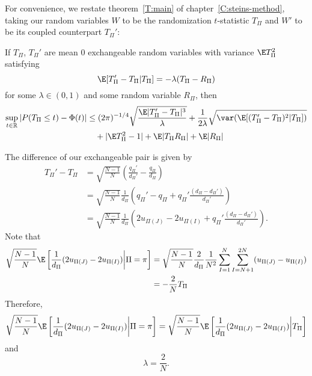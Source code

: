 For convenience, we restate theorem~\ref{T:main} of
chapter~\ref{C:steins-method}, taking our random variables $W$ to be
the randomization $t$-statistic $T_{\Pi}$ and $W'$ to be its coupled
counterpart $T_{\Pi}'$:
\begin{thma}
  If $T_{\Pi}$, $T_{\Pi}'$ are mean 0 exchangeable random variables with variance $\E T_{\Pi}^2$
  satisfying
  \begin{equation*}
    \E[T_{\Pi}'-T_{\Pi}|T_{\Pi}] = -\lambda(T_{\Pi}-R_{\Pi})
  \end{equation*}
  for some $\lambda \in (0,1)$ and some random variable $R_{\Pi}$, then
  \begin{equation*}
    \begin{split}
      \sup_{t \in \mathbb{R}} |P(T_{\Pi} \leq t) - \Phi(t)|
      &\leq (2\pi)^{-1/4} \sqrt{\frac{\E |T_{\Pi}'-T_{\Pi}|^3}{\lambda}}
      + \frac{1}{2\lambda} \sqrt{\var (\E [(T_{\Pi}'-T_{\Pi})^2|T_{\Pi}])} \\
      &\quad + |\E T_{\Pi}^2 - 1| + \E |T_{\Pi}R_{\Pi}| + \E |R_{\Pi}|
    \end{split}
  \end{equation*}
\end{thma}

The difference of our exchangeable pair is given by
\begin{align}
  T_{\Pi}' - T_{\Pi}
  &= \sqrt{\frac{N-1}{N}}\left (\frac{q_{\Pi}'}{d_{\Pi}'}-\frac{q_{\Pi}}{d_{\Pi}}\right )
  \nonumber \\
  &= \sqrt{\frac{N-1}{N}}\frac{1}{d_{\Pi}}\left (q_{\Pi}' - q_{\Pi} +
    q_{\Pi}' \frac{(d_{\Pi}-d_{\Pi}')}{d_{\Pi}'}\right ) \nonumber \\
  &= \sqrt{\frac{N-1}{N}}\frac{1}{d_{\Pi}}\left
    (2u_{\Pi(J)} - 2u_{\Pi(I)} + q_{\Pi}' \frac{(d_{\Pi}-d_{\Pi}')}{d_{\Pi}'}\right ). \label{def:ttpcubed}
\end{align}
Note that
\begin{align*}
  \sqrt{\frac{N-1}{N}} \E \left [ \frac{1}{d_{\Pi}} (2u_{\Pi(J)} - 2u_{\Pi(I)}) \middle | \Pi = \pi \right ]
  &= \sqrt{\frac{N-1}{N}} \frac{2}{d_{\Pi}} \frac{1}{N^2} \sum_{I=1}^N \sum_{I=N+1}^{2N} (u_{\Pi(J)}-u_{\Pi(I)}) \\
  &= -\frac{2}{N} T_{\Pi}
\end{align*}
Therefore,
\begin{equation*}
  \sqrt{\frac{N-1}{N}} \E \left [ \frac{1}{d_{\Pi}} (2u_{\Pi(J)} - 2u_{\Pi(I)}) \middle | \Pi = \pi \right ]
  = \sqrt{\frac{N-1}{N}} \E \left [ \frac{1}{d_{\Pi}} (2u_{\Pi(J)} - 2u_{\Pi(I)}) \middle | T_{\Pi} \right ]
\end{equation*}
and
\begin{equation*}
  \lambda = \frac{2}{N}.
\end{equation*}

